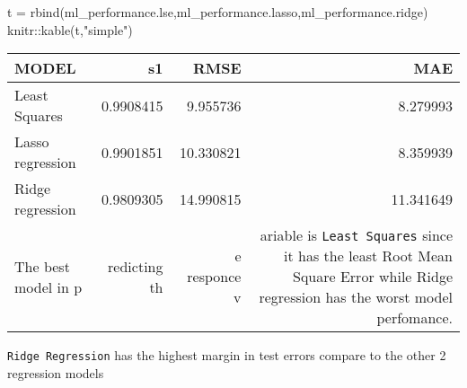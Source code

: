 \documentclass[
]{article}
\newenvironment{Shaded}{\begin{snugshade}}{\end{snugshade}}
\newcommand{\FunctionTok}[1]{\textcolor[rgb]{0.00,0.00,0.00}{#1}}
\newcommand{\NormalTok}[1]{#1}
\newcommand{\OtherTok}[1]{\textcolor[rgb]{0.56,0.35,0.01}{#1}}
\newcommand{\SpecialCharTok}[1]{\textcolor[rgb]{0.00,0.00,0.00}{#1}}
\newcommand{\StringTok}[1]{\textcolor[rgb]{0.31,0.60,0.02}{#1}}
\begin{document}
\begin{Shaded}
\begin{Highlighting}[]
\NormalTok{t }\OtherTok{=} \FunctionTok{rbind}\NormalTok{(ml\_performance.lse,ml\_performance.lasso,ml\_performance.ridge)}
\NormalTok{knitr}\SpecialCharTok{::}\FunctionTok{kable}\NormalTok{(t,}\StringTok{"simple"}\NormalTok{)}
\end{Highlighting}
\end{Shaded}

\begin{longtable}[]{@{}lrrr@{}}
\toprule
MODEL & s1 & RMSE & MAE \\
\midrule
\endhead
Least Squares & 0.9908415 & 9.955736 & 8.279993 \\
Lasso regression & 0.9901851 & 10.330821 & 8.359939 \\
Ridge regression & 0.9809305 & 14.990815 & 11.341649 \\
The best model in p & redicting th & e responce v & ariable is
\texttt{Least\ Squares} since it has the least Root Mean Square Error
while Ridge regression has the worst model perfomance. \\
\bottomrule
\end{longtable}

\texttt{Ridge\ Regression} has the highest margin in test errors compare
to the other 2 regression models
\end{document}
